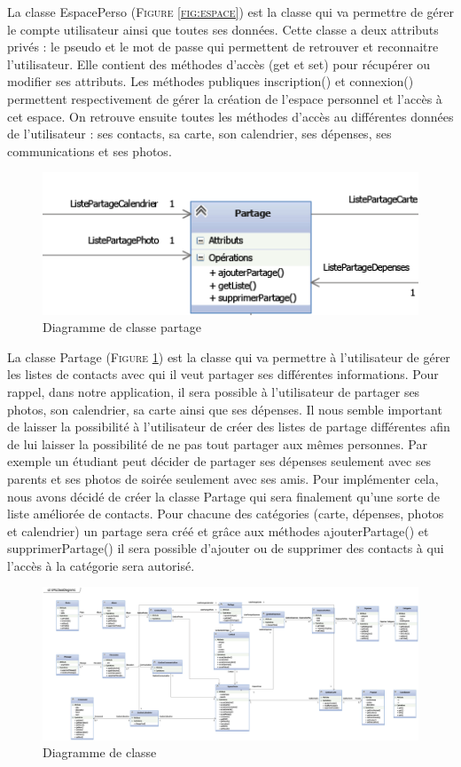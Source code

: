 \documentclass[11pt]{article}
\begin{document}
La classe EspacePerso (\textsc{Figure \ref{fig:espace}}) est la classe qui va permettre de gérer le compte utilisateur ainsi que toutes ses données. Cette classe a deux attributs privés : le pseudo et le mot de passe qui permettent de retrouver et reconnaitre l'utilisateur. Elle contient des méthodes d'accès (get et set) pour récupérer ou modifier ses attributs. Les méthodes publiques inscription() et connexion() permettent respectivement de gérer la création de l'espace personnel et l'accès à cet espace. On retrouve ensuite toutes les méthodes d'accès au différentes données de l'utilisateur : ses contacts, sa carte, son calendrier, ses dépenses, ses communications et ses photos. 


\begin{figure}[!h]
        \centering \includegraphics[scale=2]{partage.png}
        \caption{Diagramme de classe partage}
         \label{fig:partage}
\end{figure}

La classe Partage (\textsc{Figure \ref{fig:partage}}) est la classe qui va permettre à l'utilisateur de gérer les listes de contacts avec qui il veut partager ses différentes informations. 
Pour rappel, dans notre application, il sera possible à l'utilisateur de partager ses photos, son calendrier, sa carte ainsi que ses dépenses. Il nous semble important de laisser la possibilité à l'utilisateur de créer des listes de partage différentes afin de lui laisser la possibilité de ne pas tout partager aux mêmes personnes. Par exemple un étudiant peut décider de partager ses dépenses seulement avec ses parents et ses photos de soirée seulement avec ses amis. 
Pour implémenter cela, nous avons décidé de créer la classe Partage qui sera finalement qu'une sorte de liste améliorée de contacts. Pour chacune des catégories (carte, dépenses, photos et calendrier) un partage sera créé et grâce aux méthodes ajouterPartage() et supprimerPartage() il sera possible d'ajouter ou de supprimer des contacts à qui l'accès à la catégorie sera autorisé.

\newpage
\begin{figure}[!h]
        \centering \includegraphics[scale=0.9]{classe.png}
        \caption{Diagramme de classe}
         \label{fig:classe}
\end{figure}
\end{document}

